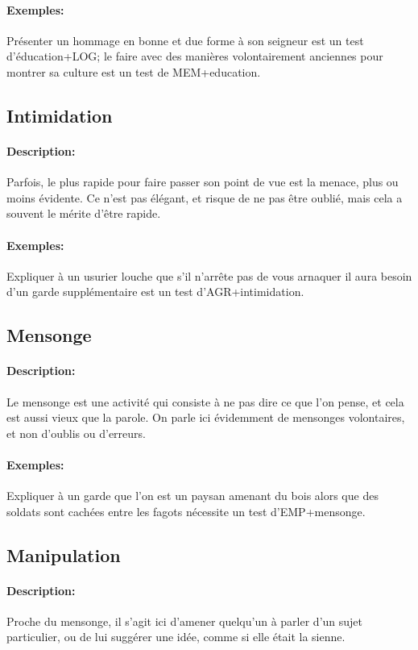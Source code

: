 \documentclass[10pt,a4paper,twocolumn]{book}
\begin{document}
\paragraph{Exemples:}Présenter un hommage en bonne et due forme à son seigneur est un test d'éducation+LOG; le faire avec des manières volontairement anciennes pour montrer sa culture est un test de MEM+education.
\subsection{Intimidation}
\paragraph{Description:}Parfois, le plus rapide pour faire passer son point de vue est la menace, plus ou moins évidente. Ce n'est pas élégant, et risque de ne pas être oublié, mais cela a souvent le mérite d'être rapide.
\paragraph{Exemples:}Expliquer à un usurier louche que s'il n'arrête pas de vous arnaquer il aura besoin d'un garde supplémentaire est un test d'AGR+intimidation.
\subsection{Mensonge}
\paragraph{Description:}Le mensonge est une activité qui consiste à ne pas dire ce que l'on pense, et cela est aussi vieux que la parole. On parle ici évidemment de mensonges volontaires, et non d'oublis ou d'erreurs.
\paragraph{Exemples:}Expliquer à un garde que l'on est un paysan amenant du bois alors que des soldats sont cachées entre les fagots nécessite un test d'EMP+mensonge.
\subsection{Manipulation}
\paragraph{Description:}Proche du mensonge, il s'agit ici d'amener quelqu'un à parler d'un sujet particulier, ou de lui suggérer une idée, comme si elle était la sienne.
\end{document}
